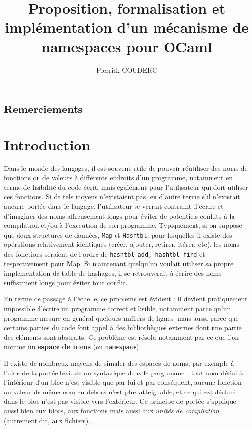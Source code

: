 \documentclass[11pt,a4paper]{report}
\title{Proposition, formalisation et implémentation d'un mécanisme de namespaces
  pour OCaml}
\author{Pierrick COUDERC}
\begin{document}
\maketitle

\section*{Remerciements}

\tableofcontents

\chapter{Introduction}

Dans le monde des langages, il est souvent utile de pouvoir réutiliser des noms
de fonctions ou de valeurs à différents endroits d'un programme, notamment en
terme de lisibilité du code écrit, mais également pour l'utilisateur qui doit
utiliser ces fonctions. Si de tels moyens n'existaient pas, en d'autre terme
s'il n'existait aucune portée dans le langage, l'utilisateur se verrait
contraint d'écrire et d'imaginer des noms affreusement longs pour éviter de
potentiels conflits à la compilation et/ou à l'exécution de son
programme. Typiquement, si on suppose que deux structures de données,
\texttt{Map} et \texttt{Hashtbl}, pour lesquelles il existe des opérations
relativement identiques (créer, ajouter, retirer, itérer, etc), les noms des
fonctions seraient de l'ordre de \texttt{hashtbl\_add, hashtbl\_find} et
respectivement pour Map. Si maintenant quelqu'un voulait utiliser sa propre
implémentation de table de hashages, il se retrouverait à écrire des noms
suffisament longs pour éviter tout conflit.

En terme de passage à l'échelle, ce problème est évident : il devient
pratiquement impossible d'écrire un programme correct et lisible, notamment
parce qu'un programme mesure en général quelques milliers de lignes, mais aussi
parce que certains parties du code font appel à des bibliothèques externes dont
une partie des éléments sont abstraits. Ce problème est résolu notamment par ce
que l'on nomme un \textbf{espace de noms} (ou \texttt{namespace}).

Il existe de nombreux moyens de simuler des espaces de noms, par exemple à
l'aide de la portée lexicale ou syntaxique dans le programme : tout nom défini à
l'intérieur d'un bloc n'est visible que par lui et par conséquent, aucune
fonction ou valeur de même nom en dehors n'est plus atteignable, et ce qui est
déclaré dans le bloc n'est pas visible vers l'extérieur. Ce principe de portée
s'applique aussi bien aux blocs, aux fonctions mais aussi aux \emph{unités de
  compilation} (autrement dit, aux fichiers).
\end{document}
